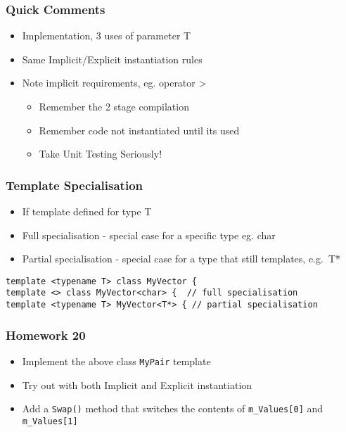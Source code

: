 \subsubsection{Quick Comments}\label{quick-comments}

\begin{itemize}
\itemsep1pt\parskip0pt
\item
  Implementation, 3 uses of parameter T
\item
  Same Implicit/Explicit instantiation rules
\item
  Note implicit requirements, eg. operator \textgreater{}

  \begin{itemize}
  \itemsep1pt\parskip0pt
  \item
    Remember the 2 stage compilation
  \item
    Remember code not instantiated until its used
  \item
    Take Unit Testing Seriously!
  \end{itemize}
\end{itemize}

\subsubsection{Template Specialisation}\label{template-specialisation}

\begin{itemize}
\itemsep1pt\parskip0pt
\item
  If template defined for type T
\item
  Full specialisation - special case for a specific type eg. char
\item
  Partial specialisation - special case for a type that still templates,
  e.g.~T*
\end{itemize}

\begin{verbatim}
template <typename T> class MyVector {
template <> class MyVector<char> {  // full specialisation
template <typename T> MyVector<T*> { // partial specialisation
\end{verbatim}

\subsubsection{Homework 20}\label{homework-20}

\begin{itemize}
\itemsep1pt\parskip0pt
\item
  Implement the above class \texttt{MyPair} template
\item
  Try out with both Implicit and Explicit instantiation
\item
  Add a \texttt{Swap()} method that switches the contents of
  \texttt{m\_Values{[}0{]}} and \texttt{m\_Values{[}1{]}}
\end{itemize}

